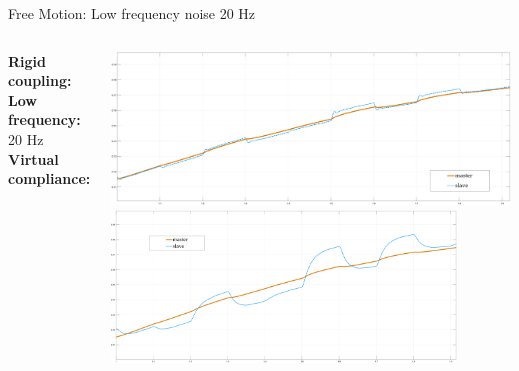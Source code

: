 \documentclass[10pt]{beamer}
\begin{document}
\begin{frame}{Free Motion: Low frequency noise 20 Hz}
\smallskip
\begin{columns}
\color{Orange}\textbf{Rigid coupling:}\\
\bigskip
\bigskip
\bigskip
\color{black}\textbf{Low frequency:} 20 Hz\\
\bigskip
\bigskip
\bigskip
\color{LightBlue}\textbf{Virtual compliance:}\\


\includegraphics[width=\textwidth,
height=0.45\textwidth]{../reportTeleop/Images/freerigidPart20Htznoise}\\
\smallskip
\includegraphics[width=\textwidth,
height=0.45\textwidth]{../reportTeleop/Images/freeSet20Part20Htznoise}
\end{columns}
\end{frame}
\end{document}
